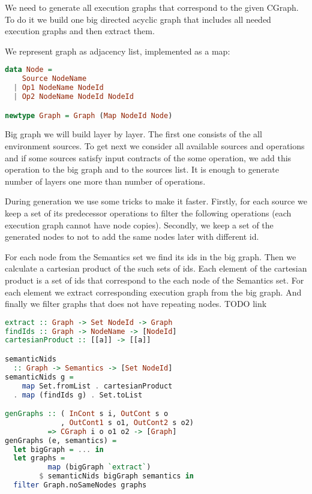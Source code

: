 We need to generate all execution graphs that correspond to the given CGraph.
To do it we build one big directed acyclic graph that includes all needed execution graphs and then extract them.

We represent graph as adjacency list, implemented as a map:

\begin{lstlisting}[language=Haskell]
data Node =
    Source NodeName
  | Op1 NodeName NodeId
  | Op2 NodeName NodeId NodeId

newtype Graph = Graph (Map NodeId Node)
\end{lstlisting}

Big graph we will build layer by layer.
The first one consists of the all environment sources.
To get next we consider all available sources and operations and if some sources satisfy input contracts of the some operation, we add this operation to the big graph and to the sources list.
It is enough to generate number of layers one more than number of operations.

During generation we use some tricks to make it faster.
Firstly, for each source we keep a set of its predecessor operations to filter the following operations (each execution graph cannot have node copies).
Secondly, we keep a set of the generated nodes to not to add the same nodes later with different id.

For each node from the Semantics set we find its ids in the big graph.
Then we calculate a cartesian product of the such sets of ids.
Each element of the cartesian product is a set of ids that correspond to the each node of the Semantics set.
For each element we extract corresponding execution graph from the big graph.
And finally we filter graphs that does not have repeating nodes.
TODO link 

\begin{lstlisting}[language=Haskell]
extract :: Graph -> Set NodeId -> Graph
findIds :: Graph -> NodeName -> [NodeId]
cartesianProduct :: [[a]] -> [[a]]

semanticNids 
  :: Graph -> Semantics -> [Set NodeId]
semanticNids g = 
    map Set.fromList . cartesianProduct 
  . map (findIds g) . Set.toList

genGraphs :: ( InCont s i, OutCont s o
             , OutCont1 s o1, OutCont2 s o2) 
          => CGraph i o o1 o2 -> [Graph]
genGraphs (e, semantics) = 
  let bigGraph = ... in
  let graphs = 
          map (bigGraph `extract`) 
        $ semanticNids bigGraph semantics in
  filter Graph.noSameNodes graphs
\end{lstlisting}
